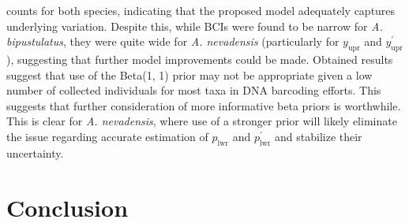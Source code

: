 \documentclass[12pt]{article}
\begin{document}
counts for both species, indicating that the proposed model adequately captures underlying variation. Despite this, while BCIs were found to be narrow for \textit{A. bipustulatus}, they were quite wide for \textit{A. nevadensis} (particularly for $y_{\mathrm{upr}}$ and $y^{'}_{\mathrm{upr}}$), suggesting that further model improvements could be made. Obtained results suggest that use of the Beta(1, 1) prior may not be appropriate given a low number of collected individuals for most taxa in DNA barcoding efforts. This suggests that further consideration of more informative beta priors is worthwhile. This is clear for \textit{A. nevadensis}, where use of a stronger prior will likely eliminate the issue regarding accurate estimation of $p_{\mathrm{lwr}}$ and $p^{'}_{\mathrm{lwr}}$ and stabilize their uncertainty.



\section{Conclusion}
\end{document}
